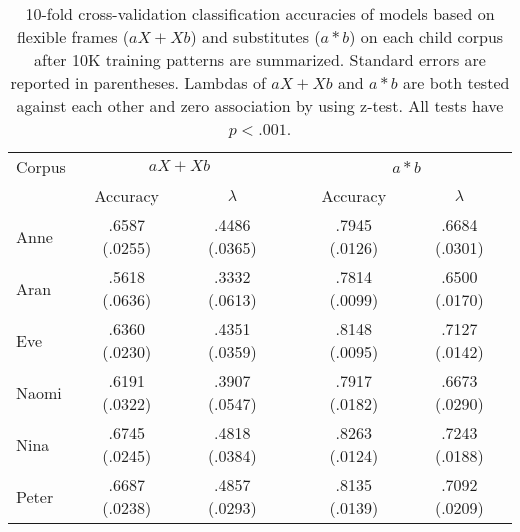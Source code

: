 \begin{table}[ht]
  \small 
  \centering
  \caption{10-fold cross-validation classification accuracies of models based
    on flexible frames ($aX + Xb$) and substitutes ($a*b$) on each child corpus
    after 10K training patterns are summarized.  Standard errors are reported
    in parentheses.  Lambdas of $aX+Xb$ and $a*b$ are both tested against each
    other and zero association by using z-test.  All tests have $p<.001$.}
\begin{tabular}{lccccc}
    \hline
    Corpus & \multicolumn{2}{c}{$aX+Xb$} && \multicolumn{2}{c}{$a*b$} \\
    \cline{2-3}
    \cline{5-6}
    & Accuracy & $\lambda$ && Accuracy & $\lambda$\\
    \hline
    Anne  & .6587 (.0255) & .4486 (.0365) && .7945 (.0126) & .6684 (.0301)\\
    Aran  & .5618 (.0636) & .3332 (.0613) && .7814 (.0099) & .6500 (.0170)\\
    Eve   & .6360 (.0230) & .4351 (.0359) && .8148 (.0095) & .7127 (.0142)\\
    Naomi & .6191 (.0322) & .3907 (.0547) && .7917 (.0182) & .6673 (.0290)\\
    Nina  & .6745 (.0245) & .4818 (.0384) && .8263 (.0124) & .7243 (.0188)\\
    Peter & .6687 (.0238) & .4857 (.0293) && .8135 (.0139) & .7092 (.0209)\\
    \hline
  \end{tabular}
  \label{t:framevssub10K}
\end{table}

